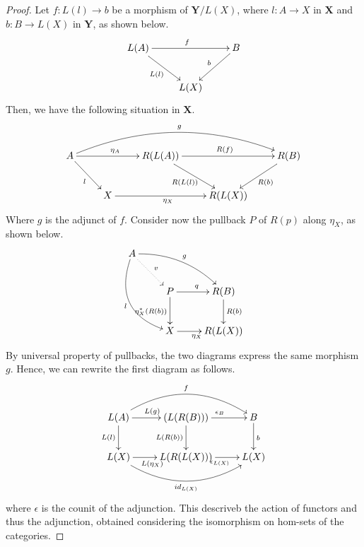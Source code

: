 \documentclass[a4paper,UKenglish,cleveref,pdftex,thm-restate,numberwithinsect]{lipics-v2021}
\newcommand{\cat}[1]{\ensuremath{\mathbf{#1}}}
\newcommand{\id}[1]{\mathsf{id}_{#1}}
\begin{document}
\begin{proof}
	Let $f: L(l) \to b$ be a morphism of $\cat Y/L(X)$, where $l: A \to X$ in $\cat X$ and $b: B \to L(X)$ in $\cat Y$, as shown below.
	\[\xymatrix{L(A)\ar[rr]^{f}\ar[dr]_{L(l)}&&B\ar[dl]_{b}\\&L(X)}\]
	Then, we have the following situation in $\cat X$.
	\[\xymatrix{
			A \ar[rr]^{\eta_A}\ar[dr]_{l} \ar@/^2.0pc/@[black][rrrr]^{g} && R(L(A)) \ar[rr]^{R(f)} \ar[dr]_{R(L(l))} && R(B) \ar[dl]^{R(b)}\\
						      & X \ar[rr]_{\eta_X} && R(L(X))
	}\]
	Where $g$ is the adjunct of $f$.
	Consider now the pullback $P$ of $R(p)$ along $\eta_X$, as shown below.
	\[\xymatrix{
		A \ar@/^1.0pc/[drr]^{g}\ar@/_2.0pc/[ddr]_{l} \ar@{.>}[dr]^{v}\\&P\ar[r]^{q}\ar[d]_{\eta_X^*(R(b))}&R(B)\ar[d]^{R(b)}\\&X \ar[r]_{\eta_X}&R(L(X))
	}\]
	By universal property of pullbacks, the two diagrams express the same morphism $g$.
	Hence, we can rewrite the first diagram as follows.
	\[\xymatrix{
			L(A)\ar[r]^{L(g)}\ar[d]_{L(l)}\ar@/^2.0pc/[rr]^{f}&(L(R(B)))\ar[d]_{L(R(b))}\ar[r]^{\epsilon_B}&B\ar[d]^{b}\\
			L(X)\ar[r]_{L(\eta_X)}\ar@/_2.0pc/[rr]_{\id{L(X)}}&L(R(L(X)))\ar[r]_{\epsilon_{L(X)}}& L(X)
	}\]
	where $\epsilon$ is the counit of the adjunction.
	This descriveb the action of functors and thus the adjunction, obtained considering the isomorphism on hom-sets of the categories.

\end{proof}


\end{document}
